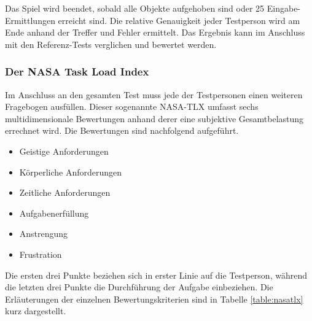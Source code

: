 Das Spiel wird beendet, sobald alle Objekte aufgehoben sind oder 25 Eingabe-Ermittlungen erreicht sind.
Die relative Genauigkeit jeder Testperson wird am Ende anhand der Treffer und Fehler ermittelt.
Das Ergebnis kann im Anschluss mit den Referenz-Tests verglichen und bewertet werden.\\



\subsubsection{Der NASA Task Load Index}
Im Anschluss an den gesamten Test muss jede der Testpersonen einen weiteren Fragebogen ausfüllen.
Dieser sogenannte \ac{NASA-TLX} \cite{hart1988development} umfasst sechs multidimensionale Bewertungen anhand derer eine subjektive Gesamtbelastung errechnet wird.
Die Bewertungen sind nachfolgend aufgeführt.

\begin{itemize}
\item Geistige Anforderungen
\item Körperliche Anforderungen
\item Zeitliche Anforderungen
\item Aufgabenerfüllung
\item Anstrengung
\item Frustration \\
\end{itemize}

Die ersten drei Punkte beziehen sich in erster Linie auf die Testperson, während die letzten drei Punkte die Durchführung der Aufgabe einbeziehen.
Die Erläuterungen der einzelnen Bewertungskriterien sind in Tabelle \ref{table:nasatlx} kurz dargestellt.

